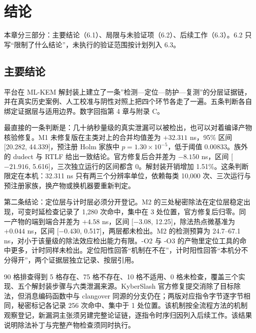 
\section{结论}

本章分三部分：主要结论（6.1）、局限与未验证项（6.2）、后续工作（6.3）。6.2 只写“限制了什么结论”，未执行的验证范围按计划列入 6.3。

\subsection{主要结论}

平台在 ML-KEM 解封装上建立了一条”检测—定位—防护—复测”的分层证据链，并在真实历史案例、人工校准与阴性对照上把四个环节各走了一遍。五条判断各自绑定证据层与适用边界。数字回指第 4 章与附录 C。%

最直接的一条判断是：几十纳秒量级的真实泄漏可以被检出，也可以对着编译产物核验修复。M1 未修复版在主类对上的合并均值差为 $+32.311$ ns，95\% 区间 [20.282, 44.339]，预注册 Holm 家族中 $p=1.30\times10^{-5}$，低于阈值 0.00833。族外的 dudect\cite{dudect} 与 RTLF\cite{rtlf} 给出一致结论。官方修复后合并差为 $-8.150$ ns，区间 [$-21.916$, 5.616]，三次独立运行的区间都含 0。解封装开销增加 1.51\%。这条判断限定在本机：32.311 ns 只有两三个分辨率单位，依赖每类 10,000 次、三次运行与预注册家族，换产物或换机器要重新判定。%

第二条结论：定位层与计时层必须分开登记。M2 的三处秘密除法在定位层稳定出现，可变时延检查记录了 1,280 次命中，集中在 3 处位置，官方修复后归零。同一产物的端到端合并差为 $+4.58$ ns，区间 [$-3.08$, 12.25]，除法热点微基准为 $+0.044$ ns，区间 [$-0.430$, 0.517]，两层都未检出。M2 的检测预算为 24.7--67.1 ns，对小于该量级的除法效应检出能力有限。-O2 与 -O3 的产物里定位工具的命中更多，计时同样未检出。定位阳性回答“机制在不在”，计时阳性回答“本机分不分得开”，两个证据层独立记录、按层引用。%

90 格排查得到 5 格存在、75 格不存在、10 格不适用、0 格未检查，覆盖三个实现、五个解封装步骤与六类泄漏来源。KyberSlash\cite{kyberslash} 官方修复提交消除了目标除法，但消息编码函数中与 clangover\cite{clangover} 同源的分支仍在；两版对应指令字节逐字节相同，秘密标记各记录 256 次命中、集中于 1 处位置。该机制按全流程方法的机制观察登记，新漏洞主张须另建完整论证链，逐指令时序归因列入后续工作。该结果说明除法补丁与完整产物检查须同时执行。%

